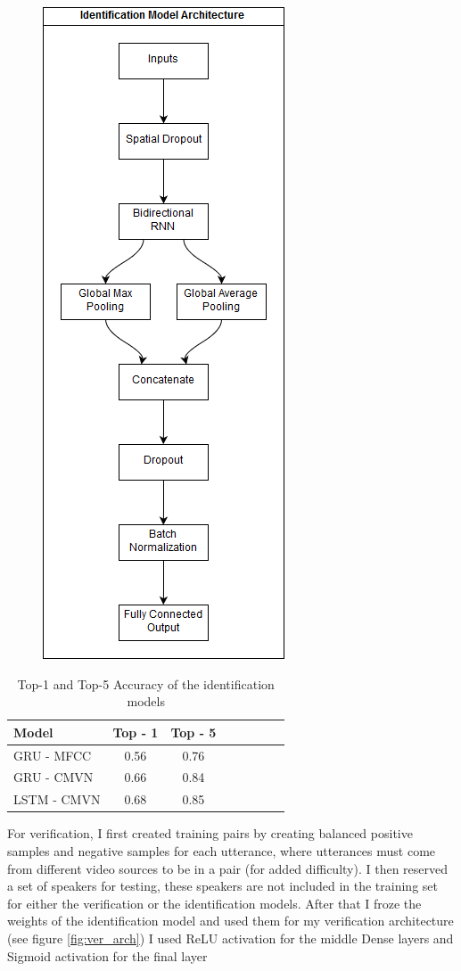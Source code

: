 \documentclass{article}
\begin{document}
\begin{figure}
    \centering
    \includegraphics[scale=.65]{images/id_model.png}
    \label{fig:id_arch}
\end{figure}
\begin{table}[]
    \centering
    \begin{tabular}{l*{6}{c}r}
        Model & Top - 1 & Top - 5\\
        \hline
        GRU - MFCC & 0.56 & 0.76  \\
        GRU - CMVN & 0.66 & 0.84  \\
        LSTM - CMVN & 0.68 & 0.85  \\
    \end{tabular}
    \caption{Top-1 and Top-5 Accuracy of the identification models}
    \label{tab:id_results}
\end{table}
For verification, I first created training pairs by creating balanced positive samples and negative samples for each utterance, where utterances must come from different video sources to be in a pair (for added difficulty). I then reserved a set of speakers for testing, these speakers are not included in the training set for either the verification or the identification models.
After that I froze the weights of the identification model and used them for my verification architecture (see figure \ref{fig:ver_arch}) I used ReLU activation for the middle Dense layers and Sigmoid activation for the final layer
\end{document}
